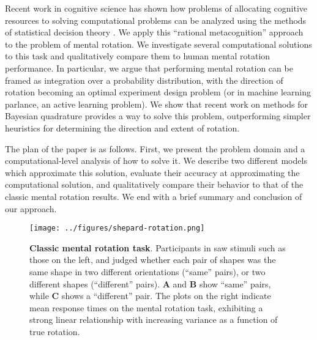 \documentclass{article} %
\begin{document}
Recent work in cognitive science has shown how problems of allocating
cognitive resources to solving computational problems can be analyzed
using the methods of statistical decision theory
\cite{Lieder:2012wg,Vul:2009wy}. We apply this ``rational
metacognition'' approach to the problem of mental rotation. We
investigate several computational solutions to this task and
qualitatively compare them to human mental rotation performance. In
particular, we argue that performing mental rotation can be framed as
integration over a probability distribution, with the direction of
rotation becoming an optimal experiment design problem (or in machine
learning parlance, an active learning problem). We show that recent
work on methods for Bayesian quadrature
\cite{Diaconis:1988uo,OHagan:1991tx,Osborne:2012tm} provides a way to
solve this problem, outperforming simpler heuristics for determining
the direction and extent of rotation.

The plan of the paper is as follows. First, we present the problem
domain and a computational-level analysis of how to solve it. We
describe two different models which approximate this solution,
evaluate their accuracy at approximating the computational solution,
and qualitatively compare their behavior to that of the classic mental
rotation results. We end with a brief summary and conclusion of our
approach.


\begin{figure}[t]
  \centering
  \texttt{[image: ../figures/shepard-rotation.png]}
  \caption{\textbf{Classic mental rotation task}. Participants in
    \cite{Shepard1971} saw stimuli such as those on the left, and
    judged whether each pair of shapes was the same shape in two
    different orientations (``same'' pairs), or two different shapes
    (``different'' pairs). \textbf{A} and \textbf{B} show ``same''
    pairs, while \textbf{C} shows a ``different'' pair. The plots on
    the right indicate mean response times on the mental rotation
    task, exhibiting a strong linear relationship with increasing
    variance as a function of true rotation.}
  \label{fig:mental-rotation}
\end{figure}

\end{document}
